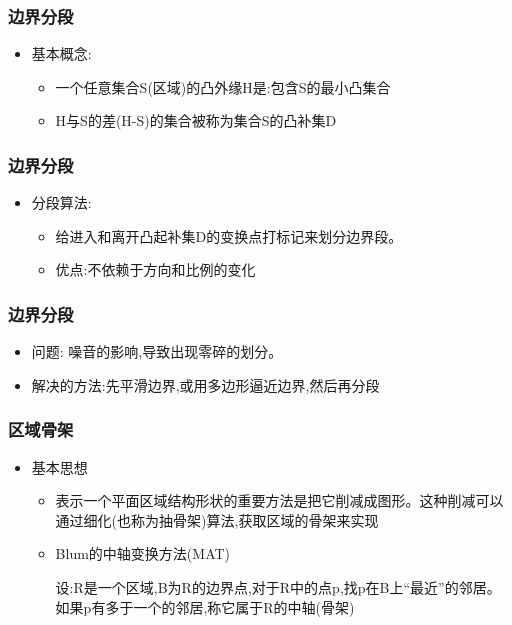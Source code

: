 \documentclass{beamer}
\begin{document}
\begin{frame}
\frametitle{边界分段}
\label{sec-2-13}

\begin{itemize}
\item 基本概念:
\begin{itemize}
\item 一个任意集合S(区域)的凸外缘H是:包含S的最小凸集合
\item H与S的差(H-S)的集合被称为集合S的凸补集D
\end{itemize}
\end{itemize}
\end{frame}
\begin{frame}
\frametitle{边界分段}
\label{sec-2-14}

\begin{itemize}
\item 分段算法:
\begin{itemize}
\item 给进入和离开凸起补集D的变换点打标记来划分边界段。
\item 优点:不依赖于方向和比例的变化
\end{itemize}
\end{itemize}
\end{frame}
\begin{frame}
\frametitle{边界分段}
\label{sec-2-15}

\begin{itemize}
\item 问题: 噪音的影响,导致出现零碎的划分。
\item 解决的方法:先平滑边界,或用多边形逼近边界,然后再分段
\end{itemize}
\end{frame}
\begin{frame}
\frametitle{区域骨架}
\label{sec-2-16}

\begin{itemize}
\item 基本思想
\begin{itemize}
\item 表示一个平面区域结构形状的重要方法是把它削减成图形。这种削减可以通过细化(也称为抽骨架)算法,获取区域的骨架来实现
\item Blum的中轴变换方法(MAT)

         设:R是一个区域,B为R的边界点,对于R中的点p,找p在B上“最近”的邻居。如果p有多于一个的邻居,称它属于R的中轴(骨架)
\end{itemize}
\end{itemize}
\end{frame}
\end{document}
